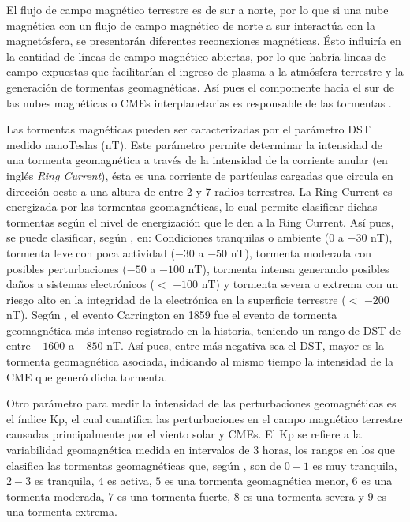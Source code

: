 
El flujo de campo magnético terrestre es de sur a norte, por lo que si una nube magnética con un flujo de campo magnético de norte a sur interactúa con la magnetósfera, se presentarán diferentes reconexiones magnéticas. Ésto influiría en la cantidad de líneas de campo magnético abiertas, por lo que habría lineas de campo expuestas que facilitarían el ingreso de plasma a la atmósfera terrestre y la generación de tormentas geomagnéticas. Así pues el compomente hacia el sur de las nubes magnéticas o CMEs interplanetarias es responsable de las tormentas \parencite[e.g.,][]{wilson-1987}.


Las tormentas magnéticas pueden ser caracterizadas por el parámetro \ac{DST} medido nanoTeslas (nT). Este parámetro permite determinar la intensidad de una tormenta geomagnética a través de la intensidad de la corriente anular (en inglés \textit{Ring Current}), ésta es una corriente de partículas cargadas que circula en dirección oeste a una altura de entre 2 y 7 radios terrestres. La Ring Current es energizada por las tormentas geomagnéticas, lo cual permite clasificar dichas tormentas según el nivel de energización que le den a la Ring Current. Así pues, se puede clasificar, según \textcite[e.g.,][]{nhess-2018-92}, en: Condiciones tranquilas o ambiente (0 a $-30$ nT), tormenta leve con poca actividad ($-30$ a $-50$ nT), tormenta moderada con posibles perturbaciones ($-50$ a $-100$ nT), tormenta intensa generando posibles daños a sistemas electrónicos ($<$ $-100$ nT) y tormenta severa o extrema con un riesgo alto en la integridad de la electrónica en la superficie terrestre ($<$ $-200$ nT). Según \textcite[e.g.,][]{2014swcm.book.....H}, el evento Carrington en 1859 fue el evento de tormenta geomagnética más intenso registrado en la historia, teniendo un rango de \ac{DST} de entre $-1600$ a $-850$ nT. Así pues, entre más negativa sea el DST, mayor es la tormenta geomagnética asociada, indicando al mismo tiempo la intensidad de la CME que generó dicha tormenta.

Otro parámetro para medir la intensidad de las perturbaciones geomagnéticas es el índice Kp, el cual cuantifica las perturbaciones en el campo magnético terrestre causadas principalmente por el viento solar y CMEs. El Kp se refiere a la variabilidad geomagnética medida en intervalos de 3 horas, los rangos en los que clasifica las tormentas geomagnéticas que, según \textcite[e.g.,][]{nhess-2018-92}, son de $0-1$ es muy tranquila, $2-3$ es tranquila, $4$ es activa, $5$ es una tormenta geomagnética menor, $6$ es una tormenta moderada, $7$ es una tormenta fuerte, $8$ es una tormenta severa y $9$ es una tormenta extrema.



